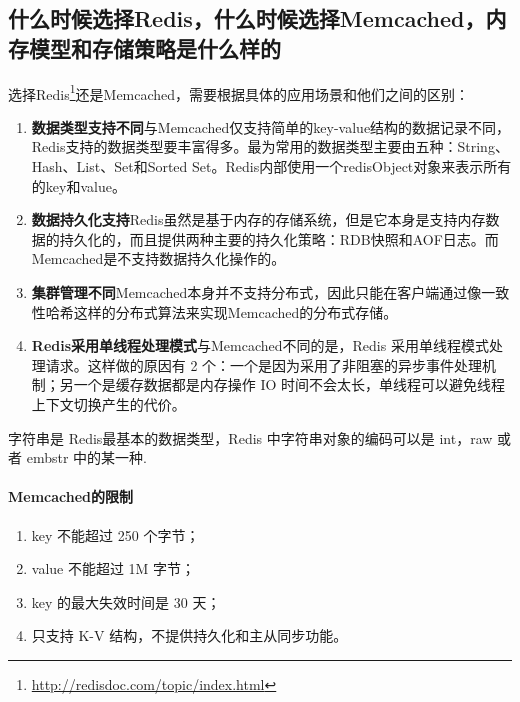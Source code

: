 \documentclass[../../../interview-questions.tex]{subfiles}
\begin{document}
\subsection{什么时候选择Redis，什么时候选择Memcached，内存模型和存储策略是什么样的}

选择Redis\footnote{\url{http://redisdoc.com/topic/index.html}}还是Memcached，需要根据具体的应用场景和他们之间的区别：

\begin{enumerate}
\item {\textbf{数据类型支持不同}}与Memcached仅支持简单的key-value结构的数据记录不同，Redis支持的数据类型要丰富得多。最为常用的数据类型主要由五种：String、Hash、List、Set和Sorted Set。Redis内部使用一个redisObject对象来表示所有的key和value。
\item {\textbf{数据持久化支持}}Redis虽然是基于内存的存储系统，但是它本身是支持内存数据的持久化的，而且提供两种主要的持久化策略：RDB快照和AOF日志。而Memcached是不支持数据持久化操作的。
\item {\textbf{集群管理不同}}Memcached本身并不支持分布式，因此只能在客户端通过像一致性哈希这样的分布式算法来实现Memcached的分布式存储。
\item {\textbf{Redis采用单线程处理模式}}与Memcached不同的是，Redis 采用单线程模式处理请求。这样做的原因有 2 个：一个是因为采用了非阻塞的异步事件处理机制；另一个是缓存数据都是内存操作 IO 时间不会太长，单线程可以避免线程上下文切换产生的代价。
\end{enumerate}                                  

字符串是 Redis最基本的数据类型，Redis 中字符串对象的编码可以是 int，raw 或者 embstr 中的某一种.

\paragraph{Memcached的限制}

\begin{enumerate}
    \item {key 不能超过 250 个字节；}
    \item {value 不能超过 1M 字节；}
    \item {key 的最大失效时间是 30 天；}
    \item {只支持 K-V 结构，不提供持久化和主从同步功能。}
\end{enumerate}
\end{document}
